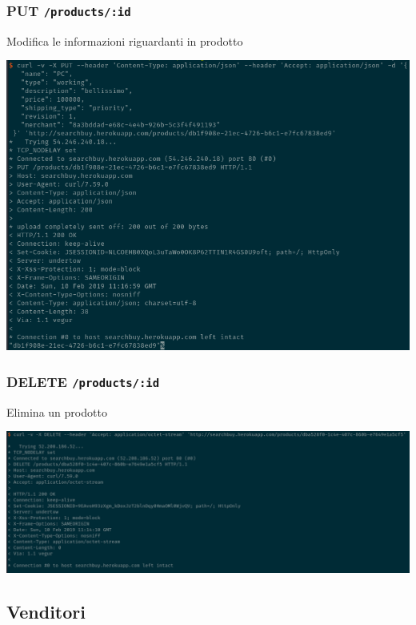 \documentclass[11pt]{article}
\begin{document}
\subsubsection{PUT \texttt{/products/:id}}
\label{sec:orgb28f336}
Modifica le informazioni riguardanti in prodotto
\begin{center}
\includegraphics[width=.9\linewidth]{img/products-screen/put-product.png}
\end{center}
\subsubsection{DELETE \texttt{/products/:id}}
\label{sec:org5251284}
Elimina un prodotto
\begin{center}
\includegraphics[width=.9\linewidth]{img/products-screen/delete-product.png}
\end{center}

\subsection{Venditori}
\label{sec:org2ae61ec}
\end{document}
